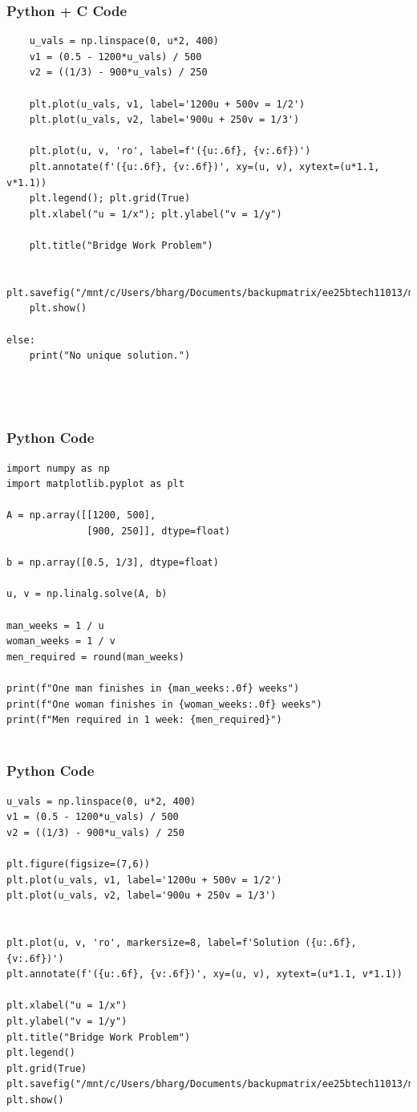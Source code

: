 \documentclass{beamer}
\begin{document}
\begin{frame}[fragile]
    \frametitle{Python + C Code}
    \begin{lstlisting}
    u_vals = np.linspace(0, u*2, 400)
    v1 = (0.5 - 1200*u_vals) / 500
    v2 = ((1/3) - 900*u_vals) / 250

    plt.plot(u_vals, v1, label='1200u + 500v = 1/2')
    plt.plot(u_vals, v2, label='900u + 250v = 1/3')

    plt.plot(u, v, 'ro', label=f'({u:.6f}, {v:.6f})')
    plt.annotate(f'({u:.6f}, {v:.6f})', xy=(u, v), xytext=(u*1.1, v*1.1))
    plt.legend(); plt.grid(True)
    plt.xlabel("u = 1/x"); plt.ylabel("v = 1/y")

    plt.title("Bridge Work Problem")

    plt.savefig("/mnt/c/Users/bharg/Documents/backupmatrix/ee25btech11013/matgeo/12.27/figs/Figure_1.png")
    plt.show()

else:
    print("No unique solution.")




    \end{lstlisting}
\end{frame}
\begin{frame}[fragile]
    \frametitle{Python Code}
    \begin{lstlisting}
import numpy as np
import matplotlib.pyplot as plt

A = np.array([[1200, 500],
              [900, 250]], dtype=float)

b = np.array([0.5, 1/3], dtype=float)

u, v = np.linalg.solve(A, b)

man_weeks = 1 / u
woman_weeks = 1 / v
men_required = round(man_weeks)

print(f"One man finishes in {man_weeks:.0f} weeks")
print(f"One woman finishes in {woman_weeks:.0f} weeks")
print(f"Men required in 1 week: {men_required}")


    \end{lstlisting}
\end{frame}
\begin{frame}[fragile]
    \frametitle{Python Code}
    \begin{lstlisting}
u_vals = np.linspace(0, u*2, 400)
v1 = (0.5 - 1200*u_vals) / 500
v2 = ((1/3) - 900*u_vals) / 250

plt.figure(figsize=(7,6))
plt.plot(u_vals, v1, label='1200u + 500v = 1/2')
plt.plot(u_vals, v2, label='900u + 250v = 1/3')


plt.plot(u, v, 'ro', markersize=8, label=f'Solution ({u:.6f}, {v:.6f})')
plt.annotate(f'({u:.6f}, {v:.6f})', xy=(u, v), xytext=(u*1.1, v*1.1))

plt.xlabel("u = 1/x")
plt.ylabel("v = 1/y")
plt.title("Bridge Work Problem")
plt.legend()
plt.grid(True)
plt.savefig("/mnt/c/Users/bharg/Documents/backupmatrix/ee25btech11013/matgeo/12.27/figs/Figure_1.png")
plt.show()



    \end{lstlisting}
\end{frame}
\end{document}
